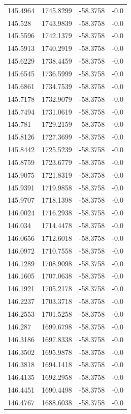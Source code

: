 \begin{table}[H]
\begin{tabular}{llll}
145.4964 & 1745.8299 & -58.3758 & -0.0 \\
145.528 & 1743.9839 & -58.3758 & -0.0 \\
145.5596 & 1742.1379 & -58.3758 & -0.0 \\
145.5913 & 1740.2919 & -58.3758 & -0.0 \\
145.6229 & 1738.4459 & -58.3758 & -0.0 \\
145.6545 & 1736.5999 & -58.3758 & -0.0 \\
145.6861 & 1734.7539 & -58.3758 & -0.0 \\
145.7178 & 1732.9079 & -58.3758 & -0.0 \\
145.7494 & 1731.0619 & -58.3758 & -0.0 \\
145.781 & 1729.2159 & -58.3758 & -0.0 \\
145.8126 & 1727.3699 & -58.3758 & -0.0 \\
145.8442 & 1725.5239 & -58.3758 & -0.0 \\
145.8759 & 1723.6779 & -58.3758 & -0.0 \\
145.9075 & 1721.8319 & -58.3758 & -0.0 \\
145.9391 & 1719.9858 & -58.3758 & -0.0 \\
145.9707 & 1718.1398 & -58.3758 & -0.0 \\
146.0024 & 1716.2938 & -58.3758 & -0.0 \\
146.034 & 1714.4478 & -58.3758 & -0.0 \\
146.0656 & 1712.6018 & -58.3758 & -0.0 \\
146.0972 & 1710.7558 & -58.3758 & -0.0 \\
146.1289 & 1708.9098 & -58.3758 & -0.0 \\
146.1605 & 1707.0638 & -58.3758 & -0.0 \\
146.1921 & 1705.2178 & -58.3758 & -0.0 \\
146.2237 & 1703.3718 & -58.3758 & -0.0 \\
146.2553 & 1701.5258 & -58.3758 & -0.0 \\
146.287 & 1699.6798 & -58.3758 & -0.0 \\
146.3186 & 1697.8338 & -58.3758 & -0.0 \\
146.3502 & 1695.9878 & -58.3758 & -0.0 \\
146.3818 & 1694.1418 & -58.3758 & -0.0 \\
146.4135 & 1692.2958 & -58.3758 & -0.0 \\
146.4451 & 1690.4498 & -58.3758 & -0.0 \\
146.4767 & 1688.6038 & -58.3758 & -0.0 \\

\end{tabular}
\end{table}
